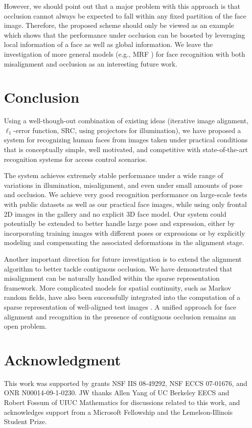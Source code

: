 \documentclass[10pt,journal,letterpaper,compsoc]{IEEEtran}
\begin{document}
However, we should point out that a major problem with this
approach is that occlusion cannot always be expected to fall within
 any fixed partition of the face image. Therefore, the
proposed scheme should only be viewed as an example which shows
that the performance under occlusion can be boosted by
leveraging local information of a face as well as global information. We
leave the investigation of more general models (e.g., MRF \cite{ZhouZ2009}) for face
recognition with both misalignment and occlusion as an
interesting future work.

\section{Conclusion}\label{sec:conclusion}
Using a well-though-out combination of existing ideas
(iterative image alignment, $\ell_1$-error function, SRC, using projectors for
illumination), we have proposed a system for recognizing human faces
from images taken under practical conditions that is conceptually simple, well
motivated, and competitive with state-of-the-art recognition systems for access
control scenarios.

The system achieves extremely stable performance under
a wide range of variations in illumination, misalignment, and even under small amounts of
pose and occlusion. We achieve very good recognition performance on
large-scale tests with public datasets as well as our practical face
images, while using only frontal 2D images in the gallery and no
explicit 3D face model.
Our system could potentially be extended to better handle large pose
and expression, either by incorporating training images with different poses or
expressions or by explicitly modeling and compensating the associated deformations
in the alignment stage.

Another important direction for future
investigation is to extend the alignment algorithm to better
tackle contiguous occlusion. We have demonstrated that misalignment can be naturally handled within the
sparse representation framework. More complicated models for
spatial continuity, such as Markov random fields, have also
been successfully integrated into the computation of a sparse
representation of well-aligned test images
\cite{Cevher2008-NIPS, ZhouZ2009}. A unified approach
for face alignment and recognition in the presence of
contiguous occlusion remains an open problem.

\section*{Acknowledgment}
This work was supported by grants NSF IIS 08-49292, NSF ECCS
07-01676, and ONR N00014-09-1-0230. JW thanks Allen Yang of UC Berkeley EECS and Robert Fossum of UIUC
Mathematics for discussions related to this work, and
acknowledges support from a Microsoft Fellowship and
the Lemelson-Illinois Student Prize. 
\end{document}

